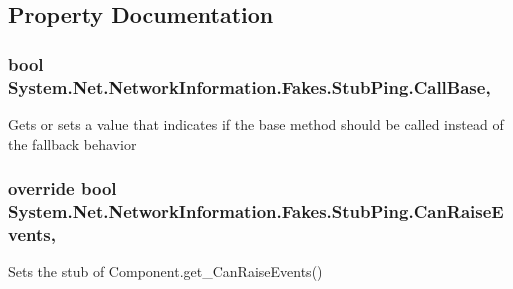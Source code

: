 \subsection{Property Documentation}
\hypertarget{class_system_1_1_net_1_1_network_information_1_1_fakes_1_1_stub_ping_af67e135ca03f83b48e561a4609db4e51}{
\subsubsection[{Call\-Base}]{\setlength{\rightskip}{0pt plus 5cm}bool System.\-Net.\-Network\-Information.\-Fakes.\-Stub\-Ping.\-Call\-Base\hspace{0.3cm}{\ttfamily [get]}, {\ttfamily [set]}}}\label{class_system_1_1_net_1_1_network_information_1_1_fakes_1_1_stub_ping_af67e135ca03f83b48e561a4609db4e51}


Gets or sets a value that indicates if the base method should be called instead of the fallback behavior

\hypertarget{class_system_1_1_net_1_1_network_information_1_1_fakes_1_1_stub_ping_afcfd1a1b6910dc847cf20961b6d4accc}{
\subsubsection[{Can\-Raise\-Events}]{\setlength{\rightskip}{0pt plus 5cm}override bool System.\-Net.\-Network\-Information.\-Fakes.\-Stub\-Ping.\-Can\-Raise\-Events\hspace{0.3cm}{\ttfamily [get]}, {\ttfamily [protected]}}}\label{class_system_1_1_net_1_1_network_information_1_1_fakes_1_1_stub_ping_afcfd1a1b6910dc847cf20961b6d4accc}


Sets the stub of Component.\-get\-\_\-\-Can\-Raise\-Events()

